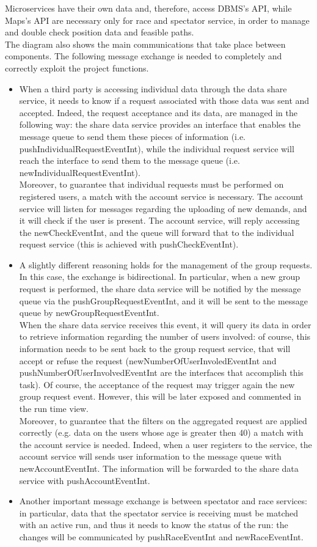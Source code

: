 Microservices have their own data and, therefore, access DBMS's API, while Maps's API are necessary 
only for race and spectator service, in order to manage and double check position data and feasible paths. \\
The diagram also shows the main communications that take place between components. 
The following message exchange is needed to completely and correctly exploit the project functions. 
\begin{itemize}
\item 
When a third party is accessing individual data through the data share service, it
needs to know if a request associated with those data was sent and accepted. 
Indeed, the request acceptance and its data, are managed in the following way: the share data service provides an interface that enables the
message queue to send them these pieces of information (i.e. pushIndividualRequestEventInt), while the individual request service will
reach the interface to send them to the message queue (i.e. newIndividualRequestEventInt). \\
Moreover, to guarantee that individual requests must be performed on registered users, a match with the account service is necessary. The 
account service will listen for messages regarding the uploading of new demands, and it will check if the user is present. 
The account service, will reply accessing the newCheckEventInt, and the queue will forward that to the individual request service (this is achieved with pushCheckEventInt).
\item 
A slightly different reasoning holds for the management of the group requests. In this case, the exchange is bidirectional. 
In particular, when a new group request is performed, the share data service will be notified by the message queue via the
pushGroupRequestEventInt, and it will be sent to the message queue by newGroupRequestEventInt. \\
When the share data service receives this event, it will query its data in order to retrieve information regarding the number of users
involved: of course, this information needs to be sent back to the group request service, that will accept or refuse the request
(newNumberOfUserInvoledEventInt and pushNumberOfUserInvolvedEventInt are the interfaces that accomplish this task). 
Of course, the acceptance of the request may trigger again the new group request event. 
However, this will be later exposed and commented in the run time view. \\
Moreover, to guarantee that the filters on the aggregated request are applied correctly (e.g. data on the users whose age is greater then 40)
a match with the account service is needed. 
Indeed, when a user registers to the service, the account service will sends user information to the message queue with newAccountEventInt. 
The information will be forwarded to the share data service with pushAccountEventInt.
\item
Another important message exchange is between spectator and race services: in particular, data that the spectator service is receiving must
be matched with an active run, and thus it needs to know the status of the run: the changes will be communicated by pushRaceEventInt and
newRaceEventInt.
\end{itemize}
